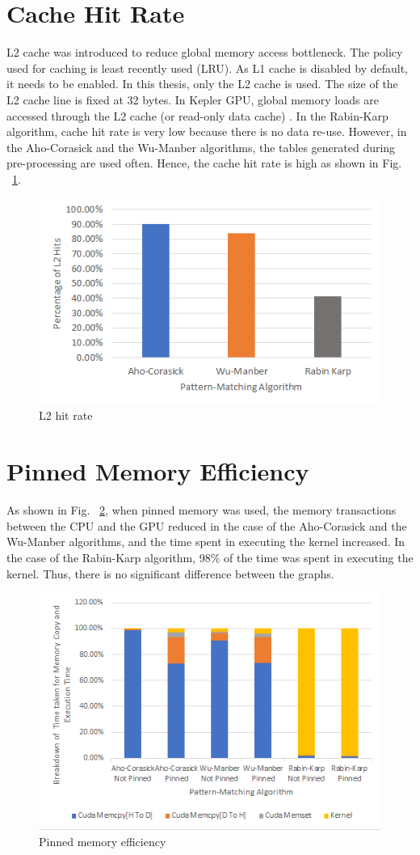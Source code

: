 \section{Cache Hit Rate}

L2 cache was introduced to reduce global memory access bottleneck. The policy used for caching is least recently used (LRU). As L1 cache is disabled by default, it needs to be enabled. In this thesis, only the L2 cache is used. The size of the L2 cache line is fixed at 32 bytes. In Kepler GPU, global memory loads are accessed through the L2 cache (or read-only data cache) \cite{bib5}. In the Rabin-Karp algorithm, cache hit rate is very low because there is no data re-use. However, in the Aho-Corasick and the Wu-Manber algorithms, the tables generated during pre-processing are used often. Hence, the cache hit rate is high as shown in Fig. ~\ref{fig:cachehitrate}.

\begin{figure}[H]
	\centering
	\includegraphics[width=12cm]{cachehitrate.png}
	\caption{L2 hit rate}
	\label{fig:cachehitrate}
\end{figure}
\squeezeup

\section{Pinned Memory Efficiency}
As shown in Fig. ~\ref{fig:pinnedmemoryeffic}, when pinned memory was used, the memory transactions between the CPU and the GPU reduced in the case of the Aho-Corasick and the Wu-Manber algorithms, and the time spent in executing the kernel increased. In the case of the Rabin-Karp algorithm, 98\% of the time was spent in executing the kernel. Thus, there is no significant difference between the graphs.

\begin{figure}[H]
	\centering
	\includegraphics[width=12cm]{pinnedmemoryeffic.png}
	\caption{Pinned memory efficiency}
	\label{fig:pinnedmemoryeffic}
\end{figure}
\squeezeup